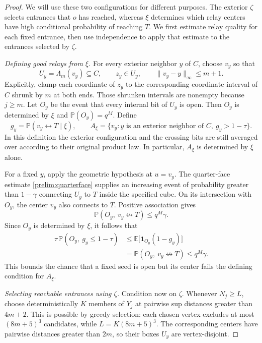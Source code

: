 \begin{proof}
We will use these two configurations for different purposes.
The exterior $\zeta$ selects entrances that $o$ has reached, whereas
$\xi$ determines which relay centers have high conditional probability
of reaching $T$. We first estimate relay quality for each fixed entrance,
then use independence to apply that estimate to the entrances selected
by $\zeta$.

\emph{Defining good relays from $\xi$.}
For every exterior neighbor $y$ of $C$, choose $v_y$ so that
\[
 U_y=\Lambda_m(v_y)\subseteq C,
 \qquad z_y\in U_y,
 \qquad \|v_y-y\|_\infty\le m+1.
\]
Explicitly, clamp each coordinate of $z_y$ to the corresponding
coordinate interval of $C$ shrunk by $m$ at both ends. Those shrunken
intervals are nonempty because $j\ge m$.
Let $O_y$ be the event that every internal bit of $U_y$ is open.
Then $O_y$ is determined by $\xi$ and $\mathbb P(O_y)=q^M$.
Define
\[
 g_y=\mathbb P(v_y\leftrightarrow T\mid\xi),
 \qquad
 A_\xi=\{v_y:y\text{ is an exterior neighbor of }C,
                         \ g_y>1-\tau\}.
\]
In this definition the exterior configuration and the crossing bits
are still averaged over according to their original product law.
In particular, $A_\xi$ is determined by $\xi$ alone.

For a fixed $y$, apply the geometric hypothesis at $u=v_y$.
The quarter-face estimate \eqref{prelim:quarterface} supplies an
increasing event of probability greater than $1-\gamma$ connecting
$U_y$ to $T$ inside the specified cube. On its intersection with $O_y$,
the center $v_y$ also connects to $T$. Positive association gives
\[
 \mathbb P(O_y,\ v_y\not\leftrightarrow T)\le q^M\gamma.
\]
Since $O_y$ is determined by $\xi$, it follows that
\begin{equation}
 \begin{split}
 \tau\,\mathbb P(O_y,\ g_y\le1-\tau)
 &\le \mathbb E\big[\mathbf 1_{O_y}(1-g_y)\big]\\
 &=\mathbb P(O_y,\ v_y\not\leftrightarrow T)
 \le q^M\gamma.
 \end{split}
 \label{ext:relay-quality}
\end{equation}
This bounds the chance that a fixed seed is open but its center fails
the defining condition for $A_\xi$.

\emph{Selecting reachable entrances using $\zeta$.}
Condition now on $\zeta$. Whenever $N_j\ge L$, choose deterministically
$K$ members of $Y_j$ at pairwise sup distances greater than $4m+2$.
This is possible by greedy selection: each chosen vertex excludes at
most $(8m+5)^3$ candidates, while $L=K(8m+5)^3$.
The corresponding centers have pairwise distances greater than $2m$,
so their boxes $U_y$ are vertex-disjoint.


\end{proof}
